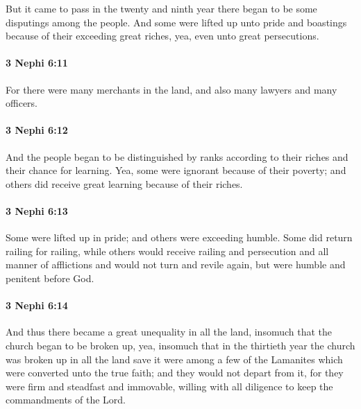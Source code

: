 			But it came to pass in the twenty and ninth year
			there began to be some disputings among the people.
			And some were lifted up unto pride and boastings
			because of their exceeding great riches,
			yea, even unto great persecutions.

		\paragraph{3 Nephi 6:11} %
			\label{3NEPHI-6-11}

			For there were many merchants in the land,
			and also many lawyers and many officers.

		\paragraph{3 Nephi 6:12} %
			\label{3NEPHI-6-12}

			And the people began to be distinguished by ranks
			according to their riches and their chance for learning.
			Yea, some were ignorant because of their poverty;
			and others did receive great learning because of their riches.

		\paragraph{3 Nephi 6:13} %
			\label{3NEPHI-6-13}

			Some were lifted up in pride;
			and others were exceeding humble.
			Some did return railing for railing,
			while others would receive railing and persecution and all manner of afflictions
			and would not turn and revile again,
			but were humble and penitent before God.

		\paragraph{3 Nephi 6:14} %
			\label{3NEPHI-6-14}

			And thus there became a great unequality in all the land,
			insomuch that the church began to be broken up,
			yea, insomuch that in the thirtieth year the church was broken up in all the land
			save it were among a few of the Lamanites
			which were converted unto the true faith;
			and they would not depart from it,
			for they were firm and steadfast and immovable,
			willing with all diligence to keep the commandments of the Lord.

